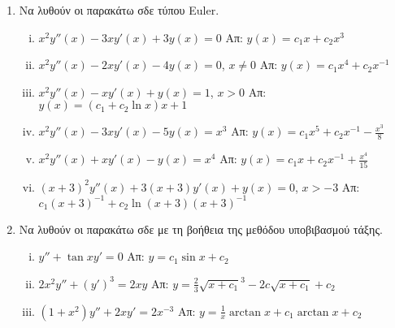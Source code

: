 



\pagestyle{askhseis}



\begin{center}
  \minibox{\large\bfseries \textcolor{Col1}{ΣΔΕ Τύπου Euler}}
\end{center}

\vspace{\baselineskip}

\begin{enumerate}
  \item Να λυθούν οι παρακάτω σδε τύπου Euler.
    \begin{enumerate}[i)]
    \item $ x^{2}y''(x)-3xy'(x)+3y(x)=0 $ 
      \hfill Απ: $ y(x)=c_{1}x + c_{2}x^{3} $
    \item $ x^{2}y''(x)-2xy'(x)-4y(x)=0 $,\; $ x \neq 0 $ 
      \hfill Απ: $ y(x)=c_{1}x^{4}+ c_{2} x^{-1} $ 
    \item $ x^{2}y''(x)-xy'(x)+y(x)=1 $,\; $ x>0 $ 
      \hfill Απ: $ y(x)=(c_{1}+c_{2} \ln{x})x + 1 $  
    \item $ x^{2}y''(x)-3xy'(x)-5y(x)=x^{3} $ 
      \hfill Απ: $ y(x)=c_{1}x^{5}+ c_{2} x^{-1}- \frac{x^{3}}{8} $ 
    \item $ x^{2}y''(x)+xy'(x)-y(x)=x^{4} $ 
      \hfill Απ: $ y(x)=c_{1}x+c_{2}x^{-1}+ \frac{x^{4}}{15} $ 
    \item \label{eul} $ (x+3)^{2}y''(x)+3(x+3)y'(x)+y(x)=0 $,\; $ x>-3 $ 
      \hfill Απ: $\scriptstyle{ c_{1} (x+3)^{-1} + c_{2}\ln(x+3)(x+3)^{-1}} $
  \end{enumerate}

\item Να λυθούν οι παρακάτω σδε με τη βοήθεια της μεθόδου υποβιβασμού τάξης.
  \begin{enumerate}[i)]
  \item $ y'' + \tan{x} y' = 0 $ \hfill Απ: $ y= c_{1} \sin{x} + c_{2} $ 
  \item $ 2x^{2}y''+ (y')^{3} = 2xy $ 
    \hfill Απ: $ y= \frac{2}{3} \sqrt{x+c_{1}}^{3} - 
    2c \sqrt{x+c_{1}} + c_{2} $ 
  \item $ (1+x^{2})y'' + 2xy' = 2x^{-3} $ \hfill Απ: $ y= \frac{1}{x} 
    \arctan x + c_{1} \arctan x + c_{2} $ 
\end{enumerate}
\end{enumerate}


